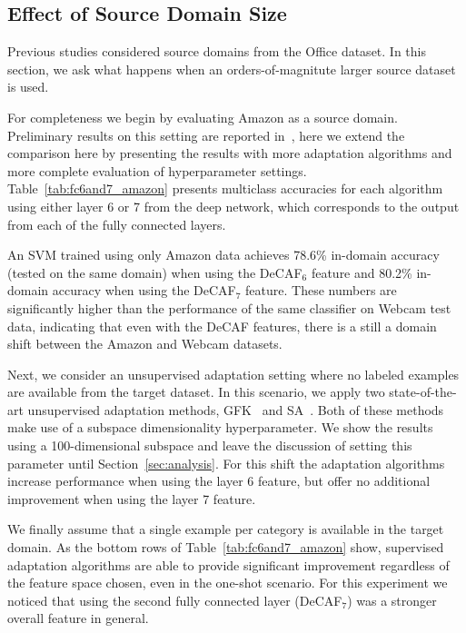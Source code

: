 


\subsection{Effect of Source Domain Size}
Previous studies considered source domains from the Office dataset. In this section, we ask what happens when an orders-of-magnitute larger source dataset is used.

For completeness we begin by evaluating Amazon as a source domain. 
Preliminary results on this setting are reported in~\cite{deeplearning-arxiv-2013}, here 
we extend the comparison here by
presenting the results with more adaptation algorithms and more complete
evaluation of hyperparameter settings. Table~\ref{tab:fc6and7_amazon} presents %
multiclass accuracies for each algorithm using either layer 6 or 7 from the deep
network, which corresponds to the output from each of the fully connected layers.

An SVM trained using only Amazon data achieves 78.6\% in-domain accuracy (tested on the same domain) when using the DeCAF$_6$ feature and 80.2\% in-domain accuracy when using the DeCAF$_7$ feature. These numbers are significantly higher than the performance of the same classifier on Webcam test data, indicating that even with the DeCAF features, there is a still a domain shift between the Amazon and Webcam datasets. 

Next, we consider an unsupervised adaptation setting where no labeled examples are available from the target dataset. In this scenario, we apply two state-of-the-art unsupervised adaptation methods, GFK~\cite{gong-cvpr12} and SA~\cite{sa}. 
Both of these methods make use of a subspace dimensionality hyperparameter.
We show the results using a 100-dimensional subspace and leave the discussion of setting this parameter until Section~\ref{sec:analysis}. For this shift the adaptation algorithms increase performance when using the layer 6 feature, but offer no additional improvement when using the layer 7 feature. 

We finally assume that a single example per category is available in the target domain.
As the bottom rows of Table~\ref{tab:fc6and7_amazon} show, supervised adaptation algorithms are able to provide significant improvement regardless of the feature space chosen, even in the one-shot scenario. %
For this experiment we noticed that using the second fully connected layer (DeCAF$_7$) was a stronger overall feature in general.

